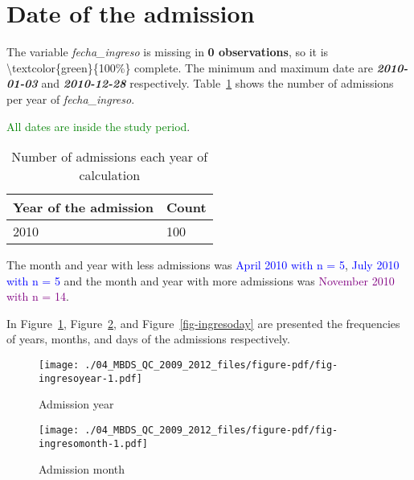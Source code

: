 \documentclass[
  letterpaper,
  DIV=11,
  numbers=noendperiod]{scrreprt}
\begin{document}
\hypertarget{date-of-the-admission}{%
\section{Date of the admission}\label{date-of-the-admission}}

The variable \emph{fecha\_ingreso} is missing in \textbf{0
observations}, so it is \textbackslash textcolor\{green\}\{100\%\}
complete. The minimum and maximum date are \textbf{\emph{2010-01-03}}
and \textbf{\emph{2010-12-28}} respectively. Table~\ref{tbl-fechaing}
shows the number of admissions per year of \emph{fecha\_ingreso}.

\textcolor{green}{All dates are inside the study period}.

\hypertarget{tbl-fechaing}{}
\begin{longtable}{ll}
\caption{\label{tbl-fechaing}Number of admissions each year of calculation }\tabularnewline

\toprule
Year of the admission & Count \\ 
\midrule
2010 & 100 \\ 
\bottomrule
\end{longtable}

The month and year with less admissions was
\textcolor{blue}{April 2010 with n = 5},
\textcolor{blue}{July 2010 with n = 5} and the month and year with more
admissions was \textcolor{purple}{November 2010 with n = 14}.

In Figure~\ref{fig-ingresoyear}, Figure~\ref{fig-ingresomonth}, and
Figure~\ref{fig-ingresoday} are presented the frequencies of years,
months, and days of the admissions respectively.

\begin{figure}

{\centering \texttt{[image: ./04\_MBDS\_QC\_2009\_2012\_files/figure-pdf/fig-ingresoyear-1.pdf]}

}

\caption{\label{fig-ingresoyear}Admission year}

\end{figure}

\begin{figure}

{\centering \texttt{[image: ./04\_MBDS\_QC\_2009\_2012\_files/figure-pdf/fig-ingresomonth-1.pdf]}

}

\caption{\label{fig-ingresomonth}Admission month}

\end{figure}
\end{document}
